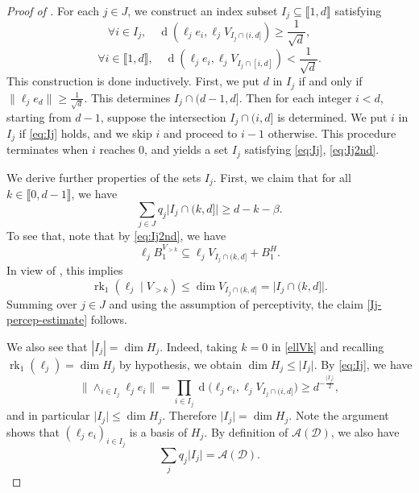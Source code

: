 \documentclass[a4paper,english]{amsart}
\theoremstyle{definition}
\newcommand{\1}{\mathbbm{1}}
\newcommand{\sD} {{\mathscr D}}
\newcommand{\sR}{\mathscr{R}}
\newcommand{\sA}{\mathscr{A}}
\DeclareMathOperator{\dist}{d}
\DeclareMathOperator{\rk}{rk}
\newcommand{\abs}[1]{\lvert#1\rvert}    %
\newcommand{\norm}[1]{\lVert#1\rVert}   %
\newcommand{\llrr}[1]{\llbracket#1\rrbracket}       %
\renewcommand{\subset}{\subseteq}
\begin{document}
\begin{proof}[Proof of ]
For each $j \in J$, we construct an index subset $I_j \subset \llrr{1,d}$ satisfying
\begin{equation}
\label{eq:Ij}
\forall i \in I_{j}, \quad \dist(\ell_j e_i, \ell_j V_{I_j \cap (i,d] }) \geq \frac{1}{\sqrt{d}},
\end{equation}
\begin{equation}\label{eq:Ij2nd}
\forall i \in \llrr{1,d},\quad \dist(\ell_j e_i, \ell_j V_{I_j \cap [i,d]}) < \frac{1}{\sqrt{d}}.
\end{equation}
This construction is done inductively.
First, we put $d$ in $I_j$ if and only if $\norm{\ell_j e_d} \geq \frac{1}{\sqrt{d}}$.
This determines $I_j \cap (d-1,d]$.
Then for each integer $i < d$, starting from $d - 1$, suppose the intersection $I_j \cap (i, d]$ is determined.
We put $i$ in $I_j$ if \eqref{eq:Ij} holds, and we skip $i$ and proceed to $i - 1$ otherwise.
This procedure terminates when $i$ reaches $0$, and yields a set $I_{j}$ satisfying \eqref{eq:Ij}, \eqref{eq:Ij2nd}.


We derive further properties of the sets $I_{j}$. First, we claim that for all $k\in \llrr{0, d - 1}$, we have
\begin{equation}\label{Ij-percep-estimate}
\sum_{j\in J} q_{j} \abs{I_j \cap (k, d] }  \geq d - k - \beta.
\end{equation}
To see that, note that by \eqref{eq:Ij2nd}, we have
\begin{equation*}%
\ell_j B_{1}^{V_{> k}} \subset \ell_j V_{I_j \cap (k,d]} + B^H_{1}.
\end{equation*}
In view of , this implies
\begin{equation}\label{ellVk}
\rk_1(\ell_j \mid V_{> k}) \leq \dim V_{I_j \cap (k, d]} = \abs{I_j \cap (k, d]}.
\end{equation}
Summing over $j \in J$ and using the assumption of perceptivity, the claim \eqref{Ij-percep-estimate} follows.


We also see that $|I_{j}|=\dim H_{j}$. Indeed, taking $k=0$ in \eqref{ellVk} and recalling $\rk_{1}(\ell_j) = \dim H_j$ by hypothesis, we obtain $\dim H_j \leq \abs{I_j}$.
By \eqref{eq:Ij}, we have
\begin{equation}\label{eq:detellj}
\norm{\wedge_{i\in I_{j}}\ell_{j}e_{i} } = \prod_{i \in I_j} \dist\bigl(\ell_j e_i, \ell_j V_{I_j \cap (i,d]}\bigr) \geq d^{-\frac{\abs{I_j}}{2}},
\end{equation}
and in particular $\abs{I_j} \leq \dim H_j$.
Therefore $\abs{I_j}=\dim H_{j}$. Note the argument shows that $(\ell_{j}e_{i})_{i\in I_{j}}$ is a basis of $H_{j}$. By definition of $\sA(\sD)$, we also have
\begin{equation}\label{Ij-cardinal}
\sum_{j}q_{j} \abs{I_{j}} = \sA(\sD).
\end{equation}



\end{proof}
\end{document}
